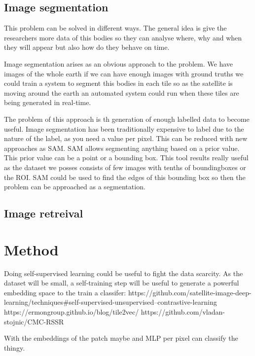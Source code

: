 \documentclass[notitlepage]{report}
\begin{document}
    \subsection*{Image segmentation}
    This problem can be solved in different ways. The general idea is give the researchers more data
    of this bodies so they can analyse where, why and when they will appear but also how do they
    behave on time.
    
    Image segmentation arises as an obvious approach to the problem. We have images of the whole earth
    if we can have enough images with ground truths we could train a system to segment this bodies in
    each tile so as the satellite is moving around the earth an automated system could run when these
    tiles are being generated in real-time.
    
    The problem of this approach is th generation of enough labelled data to become useful.
    Image segmentation has been traditionally expensive to label due to the nature of the label, as
    you need a value per pixel.
    This can be reduced with new approaches as SAM. SAM allows segmenting anything based on a prior
    value. This prior value can be a point or a bounding box. This tool results really useful as
    the dataset we posses consists of few images with tenths of boundingboxes or the ROI.
    SAM could be used to find the edges of this bounding box so then the problem can be approached
    as a segmentation.
    
    \subsection*{Image retreival}
    

    \section*{Method}

    Doing self-supervised learning could be useful to fight the data scarcity.
    As the dataset will be small, a self-training step will be useful to generate
    a powerful embedding space to the train a classifer:
    https://github.com/satellite-image-deep-learning/techniques#self-supervised-unsupervised--contrastive-learning
    https://ermongroup.github.io/blog/tile2vec/
    https://github.com/vladan-stojnic/CMC-RSSR
    
    With the embeddings of the patch maybe and MLP per pixel can classify the thingy.
    
\end{document}
